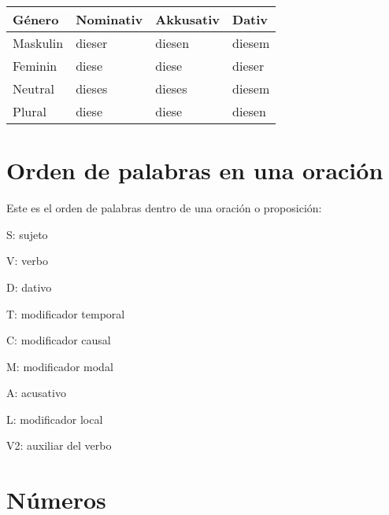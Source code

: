 \begin{tabular}{| l | l | l | l |}
\hline
\textbf{Género} & \textbf{Nominativ} & \textbf{Akkusativ} & \textbf{Dativ}\\
\hline
Maskulin & dieser & diesen & diesem  \\
Feminin  & diese  & diese  & dieser \\
Neutral  & dieses & dieses & diesem \\
Plural   & diese  & diese  & diesen \\
\hline
\end{tabular}

\section{Orden de palabras en una oración}
Este es el orden de palabras dentro de una oración o proposición:
\begin{myitemize}
\item S: sujeto
\item V: verbo
\item D: dativo
\item T: modificador temporal
\item C: modificador causal
\item M: modificador modal
\item A: acusativo
\item L: modificador local
\item V2: auxiliar del verbo
\end{myitemize}

\section{Números}
